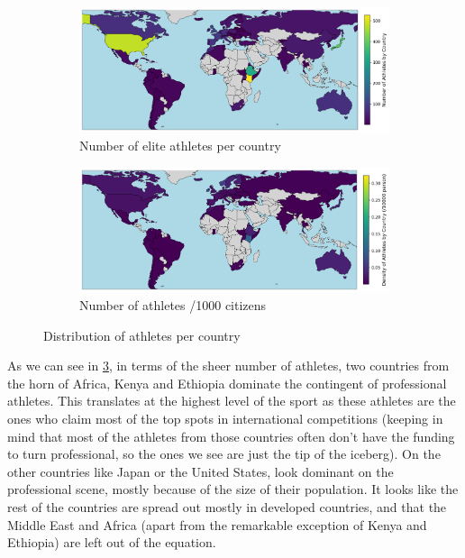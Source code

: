 \documentclass[10pt, a4paper]{article}
\begin{document}
\begin{figure}[htb]
    \centering
    \begin{subfigure}[b]{0.45\linewidth}
        \includegraphics[width=\linewidth]{Data/Figures/Athletes_countries.png}
        \caption{Number of elite athletes per country}
        \label{fig:athletes_country}
    \end{subfigure}
    \hfill
    \begin{subfigure}[b]{0.45\linewidth}
        \includegraphics[width=\linewidth]{Data/Figures/Athletes_countries_pop.png}
        \caption{Number of athletes /1000 citizens}
        \label{fig:athletes_pop}
    \end{subfigure}
    \caption{Distribution of athletes per country}
    \label{fig:athletes_countries}
\end{figure}

As we can see in \ref{fig:athletes_countries}, in terms of the sheer number of athletes, two countries from the horn of Africa, Kenya and Ethiopia dominate the contingent of professional athletes. This translates at the highest level of the sport as these athletes are the ones who claim most of the top spots in international competitions (keeping in mind that most of the athletes from those countries often don't have the funding to turn professional, so the ones we see are just the tip of the iceberg). On the other countries like Japan or the United States, look dominant on the professional scene, mostly because of the size of their population. It looks like the rest of the countries are spread out mostly in developed countries, and that the Middle East and Africa (apart from the remarkable exception of Kenya and Ethiopia) are left out of the equation.\\
\end{document}
